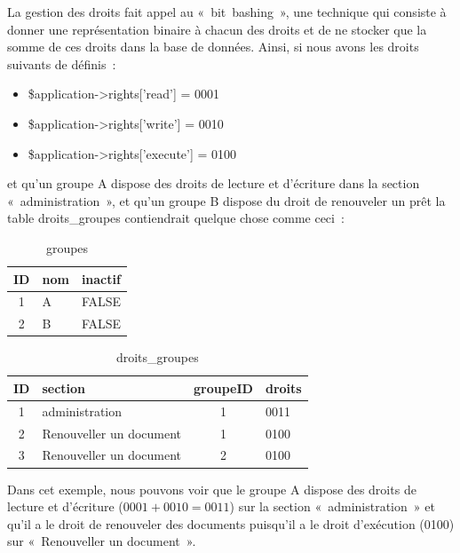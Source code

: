 \documentclass[letter, 11pt]{report}
\begin{document}
La gestion des droits fait appel au «~bit~bashing~», une technique qui consiste à donner une représentation binaire à chacun des droits et de ne stocker que la somme de ces droits dans la base de données. Ainsi, si nous avons les droits suivants de définis~:

\begin{itemize}
	\item \$application->rights['read'] = 0001
	\item \$application->rights['write'] = 0010
	\item \$application->rights['execute'] = 0100
\end{itemize}

et qu'un groupe A dispose des droits de lecture et d'écriture dans la section «~administration~», et qu'un groupe B dispose du droit de renouveler un prêt la table droits\_groupes contiendrait quelque chose comme ceci~:

\begin{table}[ht]
	\caption{groupes}
	\begin{center}
		\begin{tabular}{|c|l|l|}
			\hline
			ID & nom & inactif \\
			\hline
			1  & A   & FALSE \\
			2  & B   & FALSE \\
			\hline
		\end{tabular}
	\end{center}
\end{table}

\begin{table}[h!]
	\caption{droits\_groupes}
	\begin{center}
		\begin{tabular}{|c|l|c|l|}
			\hline
			ID & section                 & groupeID & droits \\
			\hline
			1  & administration          & 1        & 0011 \\
			2  & Renouveller un document & 1        & 0100 \\
			3  & Renouveller un document & 2        & 0100 \\
			\hline
		\end{tabular}
	\end{center}
\end{table}

Dans cet exemple, nous pouvons voir que le groupe A dispose des droits de lecture et d'écriture ($ 0001 + 0010 = 0011 $) sur la section «~administration~» et qu'il a le droit de renouveler des documents puisqu'il a le droit d'exécution (0100) sur «~Renouveller un document~».
\end{document}

